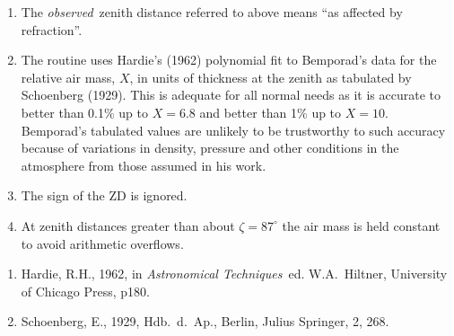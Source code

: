 {
}
{
}
{
}
\notes
{
 \begin{enumerate}
  \item The {\it observed}\, zenith distance referred to above means
        ``as affected by refraction''.
  \item The routine uses Hardie's (1962) polynomial fit to Bemporad's
        data for the relative air mass, $X$, in units of thickness at the
        zenith as tabulated by Schoenberg (1929). This is adequate for all
        normal needs as it is accurate to better than
        0.1\% up to $X = 6.8$ and better than 1\% up to $X = 10$.
        Bemporad's tabulated values are unlikely to be trustworthy
        to such accuracy 
        because of variations in density, pressure and other  
        conditions in the atmosphere from those assumed in his work.
  \item The sign of the ZD is ignored.
  \item At zenith distances greater than about $\zeta = 87^{\circ}$ the
        air mass is held constant to avoid arithmetic overflows.
 \end{enumerate}
}
{
 \begin{enumerate}
  \item Hardie, R.H., 1962, in {\it Astronomical Techniques}\,
        ed. W.A.\ Hiltner, University of Chicago Press, p180.
  \item Schoenberg, E., 1929, Hdb.\ d.\ Ap.,
        Berlin, Julius Springer, 2, 268.
 \end{enumerate}
}
{
}
{
  \\
  \\
}
{
}
\notes
